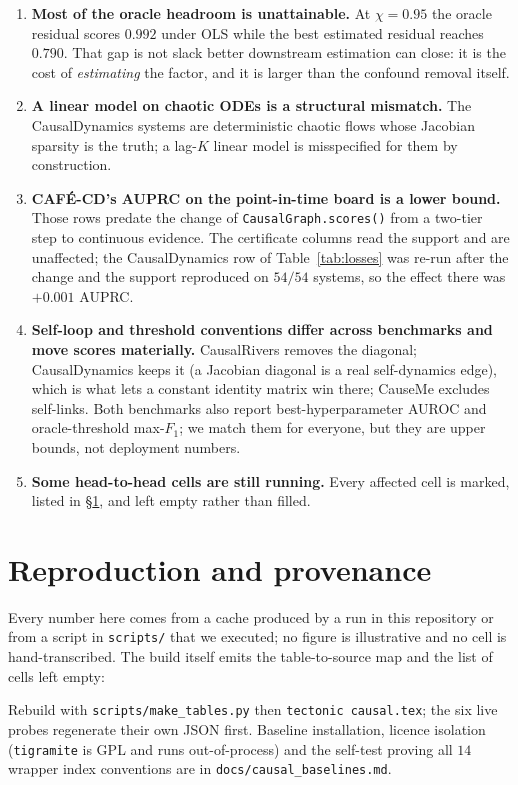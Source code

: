 \documentclass[10pt,twocolumn]{article}
\newcommand{\cafe}{CAF\'E}
\DeclareRobustCommand{\cd}{\cafe{}\nobreakdash-CD}
\begin{document}
\begin{enumerate}
  $\chi{=}0.40$ residualisation costs $0.059$--$0.072$ AUC depending on the estimator.
\item \textbf{Most of the oracle headroom is unattainable.} At $\chi{=}0.95$ the oracle
  residual scores $0.992$ under OLS while the best estimated residual reaches $0.790$.
  That gap is not slack better downstream estimation can close: it is the cost of
  \emph{estimating} the factor, and it is larger than the confound removal itself.
\item \textbf{A linear model on chaotic ODEs is a structural mismatch.} The
  CausalDynamics systems are deterministic chaotic flows whose Jacobian sparsity is the
  truth; a lag-$K$ linear model is misspecified for them by construction.
\item \textbf{\cd{}'s AUPRC on the point-in-time board is a lower bound.} Those rows
  predate the change of \texttt{CausalGraph.scores()} from a two-tier step to continuous
  evidence. The certificate columns read the support and are unaffected; the
  CausalDynamics row of Table~\ref{tab:losses} was re-run after the change and the
  support reproduced on $54/54$ systems, so the effect there was $+0.001$ AUPRC.
\item \textbf{Self-loop and threshold conventions differ across benchmarks and move
  scores materially.} CausalRivers removes the diagonal; CausalDynamics keeps it (a
  Jacobian diagonal is a real self-dynamics edge), which is what lets a constant
  identity matrix win there; CauseMe excludes self-links. Both benchmarks also report
  best-hyperparameter AUROC and oracle-threshold max-$F_1$; we match them for everyone,
  but they are upper bounds, not deployment numbers.
\item \textbf{Some head-to-head cells are still running.} Every affected cell is
  marked, listed in \S\ref{sec:repro}, and left empty rather than filled.
\end{enumerate}

\section{Reproduction and provenance}\label{sec:repro}
Every number here comes from a cache produced by a run in this repository or from a
script in \texttt{scripts/} that we executed; no figure is illustrative and no cell is
hand-transcribed. The build itself emits the table-to-source map and the list of cells
left empty:



\noindent
Rebuild with \texttt{scripts/make\_tables.py} then \texttt{tectonic causal.tex}; the
six live probes regenerate their own JSON first. Baseline installation, licence
isolation (\texttt{tigramite} is GPL and runs out-of-process) and the self-test proving
all $14$ wrapper index conventions are in \texttt{docs/causal\_baselines.md}.
\end{document}
